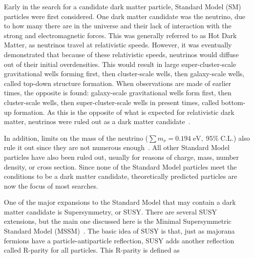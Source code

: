
Early in the search for a candidate dark matter particle, Standard Model (SM) particles were first considered.
One dark matter candidate was the neutrino, due to how many there are in the universe and their lack of interaction with the strong and electromagnetic forces.
This was generally referred to as Hot Dark Matter, as neutrinos travel at relativistic speeds.
However, it was eventually demonstrated that because of these relativistic speeds, neutrinos would diffuse out of their initial overdensities.
This would result in large super-cluster-scale gravitational wells forming first, then cluster-scale wells, then galaxy-scale wells, called top-down structure formation.
When observations are made of earlier times, the opposite is found: galaxy-scale gravitational wells form first, then cluster-scale wells, then super-cluster-scale wells in present times, called bottom-up formation.
As this is the opposite of what is expected for relativistic dark matter, neutrinos were ruled out as a dark matter candidate~\cite{neutrinoHeirarchical}.

In addition, limits on the mass of the neutrino ($\sum{}m_{\nu} = 0.194 \; \textrm{eV}, \; 95\% \; \textrm{C.L.}$) also rule it out since they are not numerous enough~\cite{planck2015}.
All other Standard Model particles have also been ruled out, usually for reasons of charge, mass, number density, or cross section.
Since none of the Standard Model particles meet the conditions to be a dark matter candidate, theoretically predicted particles are now the focus of most searches.

One of the major expansions to the Standard Model that may contain a dark matter candidate is Supersymmetry, or SUSY.
There are several SUSY extensions, but the main one discussed here is the Minimal Supersymmetric Standard Model (MSSM)~\cite{MSSM,supersym1,schelke_thesis}.
The basic idea of SUSY is that, just as majorana fermions have a particle-antiparticle reflection, SUSY adds another reflection called R-parity for all particles. 
This R-parity is defined as

